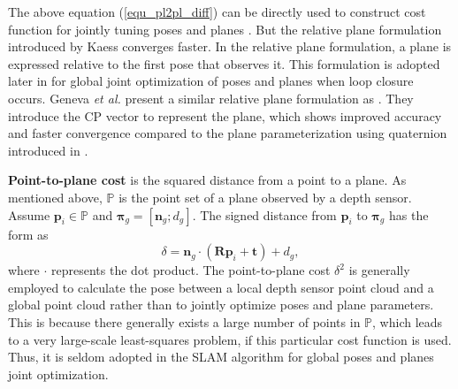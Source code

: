 \documentclass{vgtc}                          %
\begin{document}
The   above equation (\ref{equ_pl2pl_diff}) can be directly used to construct  cost function for jointly tuning poses and planes \cite{huang2019optimization}. But the relative plane formulation introduced by Kaess \cite{kaess2015simultaneous}  converges faster.  In the relative plane formulation, a plane is  expressed relative to  the first pose  that observes it. This formulation is adopted later in \cite{hsiao2017keyframe,hsiao2018dense} for  global joint optimization of poses and planes when loop closure occurs.  Geneva \textit{et al.} \cite{geneva2018lips} present  a similar relative plane formulation as \cite{kaess2015simultaneous}. They  introduce the CP vector to represent   the plane, which shows improved accuracy and faster convergence compared to  the plane parameterization using quaternion introduced in \cite{kaess2015simultaneous}. %

\textbf{Point-to-plane cost} is the squared  distance from a point to a plane. %
As mentioned above, $\mathbb{P}$ is the point set of a plane observed by a depth sensor. Assume $\mathbf{p}_i \in \mathbb{P}$ and $\bm{\pi}_g = \left[ \mathbf{n}_g ; d_g\right] $. The signed distance from $\mathbf{p}_i $ to $\bm{\pi}_g$ has the form as  
\begin{equation} \label{equ_p2pl}
	\delta = \mathbf{n}_g \cdot \left(\mathbf{R} \mathbf{p}_i +\mathbf{t}\right) + d_g,
\end{equation}
where $\cdot$ represents the  dot product. %
The point-to-plane cost $\delta^2$  is generally employed to calculate the pose between a local depth sensor point cloud  and a  global point cloud \cite{newcombe2011kinectfusion,zhang2017low,hsiao2017keyframe,zhou2020icra} %
rather than to  jointly optimize poses and plane parameters. This is because there generally exists a large number of points in $\mathbb{P}$, %
which leads to a very large-scale least-squares problem, if this particular cost function is used. Thus, it is  seldom adopted in the SLAM algorithm for global poses and planes joint optimization. 
\end{document}
